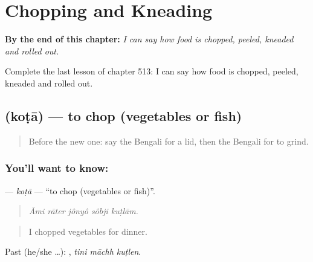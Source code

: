 
\chapter{Chopping and Kneading}
\label{ch:bn-chopping-and-kneading}

\begin{chapteropening}
\textbf{By the end of this chapter:} \emph{I can say how food is chopped, peeled, kneaded and rolled out.}

Complete the last lesson of chapter 513: I can say how food is chopped, peeled, kneaded and rolled out.
\end{chapteropening}

\section[\texorpdfstring{\bn{কোটা} (koṭā)}{কোটা (koṭā)}]{ (koṭā) — to chop (vegetables or fish)}

\label{lesson:BN-C513-kota}



\begin{quote}
Before the new one: say the Bengali for a lid, then the Bengali for to grind.
\end{quote}

\subsection*{You'll want to know: }
\textbf{} — \emph{koṭā} — \textquotedblleft{}to chop (vegetables or fish)\textquotedblright{}.

\begin{quote}
    
\end{quote}

\begin{quote}
\emph{Āmi rāter jônyô sôbji kuṭlām.}
\end{quote}

\begin{quote}
I chopped vegetables for dinner.
\end{quote}

Past (he/she …):   , \emph{tini māchh kuṭlen}.

